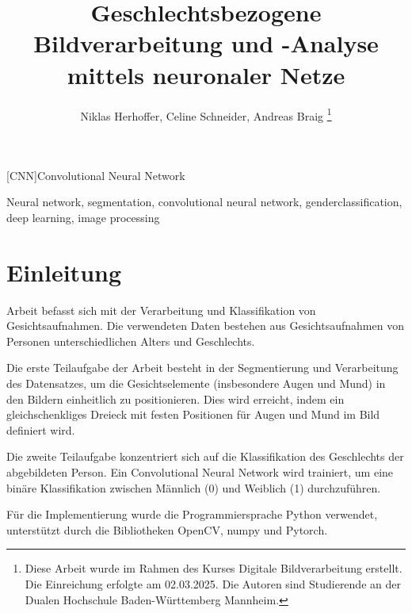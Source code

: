\documentclass[journal,twoside,web]{ieeecolor}
\begin{document}
\begin{acronym}
    [CNN]{Convolutional Neural Network} 
\end{acronym}

\title{Geschlechtsbezogene Bildverarbeitung und -Analyse mittels neuronaler Netze} %
\author{Niklas Herhoffer, Celine Schneider, Andreas Braig
\thanks{Diese Arbeit wurde im Rahmen des Kurses Digitale Bildverarbeitung erstellt. Die Einreichung erfolgte am 02.03.2025. Die Autoren sind Studierende an der Dualen Hochschule Baden-Württemberg Mannheim.}
}


\maketitle

    


\begin{IEEEkeywords}
    Neural network, segmentation, convolutional neural network, genderclassification, deep learning, image processing
\end{IEEEkeywords}

\section{Einleitung}
\label{sec:introduction}
 Arbeit befasst sich mit der Verarbeitung und Klassifikation von Gesichtsaufnahmen. Die verwendeten Daten bestehen aus Gesichtsaufnahmen von Personen unterschiedlichen Alters und Geschlechts. 

Die erste Teilaufgabe der Arbeit besteht in der Segmentierung und Verarbeitung des Datensatzes, um die Gesichtselemente (insbesondere Augen und Mund) in den Bildern einheitlich zu positionieren. Dies wird erreicht, indem ein gleichschenkliges Dreieck mit festen Positionen für Augen und Mund im Bild definiert wird. 

Die zweite Teilaufgabe konzentriert sich auf die Klassifikation des Geschlechts der abgebildeten Person. Ein Convolutional Neural Network wird trainiert, um eine binäre Klassifikation zwischen Männlich (0) und Weiblich (1) durchzuführen.

Für die Implementierung wurde die Programmiersprache Python verwendet, unterstützt durch die Bibliotheken OpenCV, numpy und Pytorch.
\end{document}
